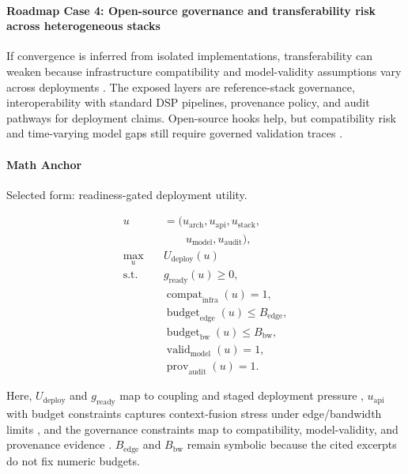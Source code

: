 \documentclass[letterpaper,journal]{IEEEtran}
\begin{document}
\paragraph{Roadmap Case 4: Open-source governance and transferability risk across heterogeneous stacks}
If convergence is inferred from isolated implementations, transferability can weaken because infrastructure compatibility and model-validity assumptions vary across deployments \cite{O_ISAC_200}. The exposed layers are reference-stack governance, interoperability with standard DSP pipelines, provenance policy, and audit pathways for deployment claims. Open-source hooks help, but compatibility risk and time-varying model gaps still require governed validation traces \cite{O_ISAC_200}.

\paragraph{Math Anchor}
Selected form: readiness-gated deployment utility.

\begin{equation}
    \begin{aligned}
        u                 & = (u_{\mathrm{arch}},u_{\mathrm{api}},u_{\mathrm{stack}},       \\
                          & \qquad u_{\mathrm{model}},u_{\mathrm{audit}}),                  \\
        \max_{u} \quad    & U_{\mathrm{deploy}}(u)                                          \\
        \text{s.t.} \quad & g_{\mathrm{ready}}(u) \ge 0,                                    \\
                          & \operatorname{compat}_{\mathrm{infra}}(u)=1,                    \\
                          & \operatorname{budget}_{\mathrm{edge}}(u) \le B_{\mathrm{edge}}, \\
                          & \operatorname{budget}_{\mathrm{bw}}(u) \le B_{\mathrm{bw}},     \\
                          & \operatorname{valid}_{\mathrm{model}}(u)=1,                     \\
                          & \operatorname{prov}_{\mathrm{audit}}(u)=1.
    \end{aligned}
\end{equation}

Here, $U_{\mathrm{deploy}}$ and $g_{\mathrm{ready}}$ map to coupling and staged deployment pressure \cite{O_ISAC_039, O_ISAC_163}, $u_{\mathrm{api}}$ with budget constraints captures context-fusion stress under edge/bandwidth limits \cite{O_ISAC_151}, and the governance constraints map to compatibility, model-validity, and provenance evidence \cite{O_ISAC_200}. $B_{\mathrm{edge}}$ and $B_{\mathrm{bw}}$ remain symbolic because the cited excerpts do not fix numeric budgets.
\end{document}

